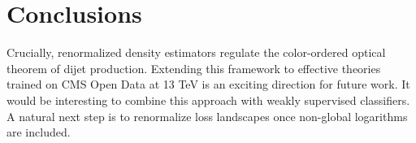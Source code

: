 \section{Conclusions}\label{sec:conclusions}

Crucially, renormalized density estimators regulate the color-ordered
optical theorem of dijet production. Extending this framework to
effective theories trained on CMS Open Data at 13 TeV is an exciting
direction for future work. It would be interesting to combine this
approach with weakly supervised classifiers. A natural next step is to
renormalize loss landscapes once non-global logarithms are included.

